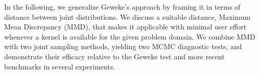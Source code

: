 \documentclass{article}
\begin{document}
In the following, we generalize Geweke's approach by framing it in terms of distance between joint distributions. We discuss a suitable distance, Maximum Mean Discrepancy (MMD), that makes it applicable with minimal user effort whenever a kernel is available for the given problem domain. We combine MMD with two joint sampling methods, yielding two MCMC diagnostic tests, and demonstrate their efficacy relative to the Geweke test and more recent benchmarks in several experiments.


\end{document}
